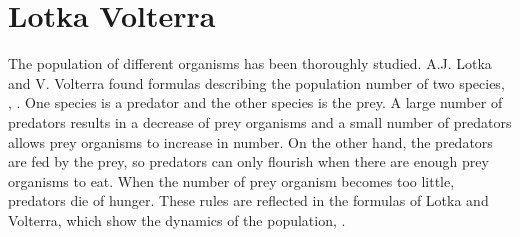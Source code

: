 \documentclass[11pt]{article}
\begin{document}
\section{Lotka Volterra}
The population of different organisms has been thoroughly studied. A.J. Lotka and V. Volterra found formulas describing the population number of two species, \cite{lotka}, \cite{volterra}. One species is a predator and the other species is the prey. A large number of predators results in a decrease of prey organisms and a small number of predators allows prey organisms to increase in number. On the other hand, the predators are fed by the prey, so predators can only flourish when there are enough prey organisms to eat. When the number of prey organism becomes too little, predators die of hunger. These rules are reflected in the formulas of Lotka and Volterra, which show the dynamics of the population, \cite{lotkaVolterra}.\\
\end{document}
